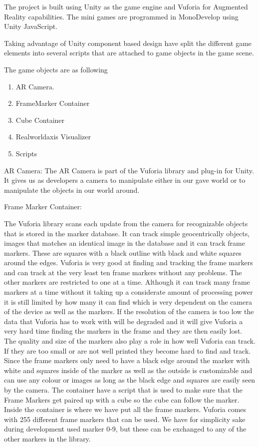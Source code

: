 The project is built using Unity as the game engine and Vuforia for Augmented Reality capabilities. The mini games are programmed in MonoDevelop using Unity JavaScript.


Taking advantage of Unity component based design have split the different game elements into several scripts that are attached to game objects in the game scene.

The game objects are as following
\begin{enumerate}
	\item AR Camera.
	\item FrameMarker Container
	\item Cube Container
	\item Realworldaxis Visualizer
	\item Scripts
\end{enumerate}

AR Camera:
The AR Camera is part of the Vuforia library and plug-in for Unity. It gives us as developers a camera to manipulate either in our gave world or to manipulate the objects in our world around.

Frame Marker Container:

The Vuforia library scans each update from the camera for recognizable objects that is stored in the marker database. It can track simple geocentrically objects, images that matches an identical image in the database and it can track frame markers. These are squares with a black outline with black and white squares around the edges. Vuforia is very good at finding and tracking the frame markers and can track at the very least ten frame markers without any problems. The other markers are restricted to one at a time.
Although it can track many frame markers at a time without it taking up a considerate amount of processing power it is still limited by how many it can find which is very dependent on the camera of the device as well as the markers. If the resolution of the camera is too low the data that Vuforia has to work with will be degraded and it will give Vuforia a very hard time finding the markers in the frame and they are then easily lost. The quality and size of the markers also play a role in how well Vuforia can track. If they are too small or are not well printed they become hard to find and track. Since the frame markers only need to have a black edge around the marker with white and squares inside of the marker as well as the outside is customizable and can use any colour or images as long as the black edge and squares are easily seen by the camera.
The container have a script that is used to make sure that the Frame Markers get paired up with a cube so the cube can follow the marker.
Inside the container is where we have put all the frame markers. Vuforia comes with 255 different frame markers that can be used. We have for simplicity sake during development used marker 0-9, but these can be exchanged to any of the other markers in the library.

